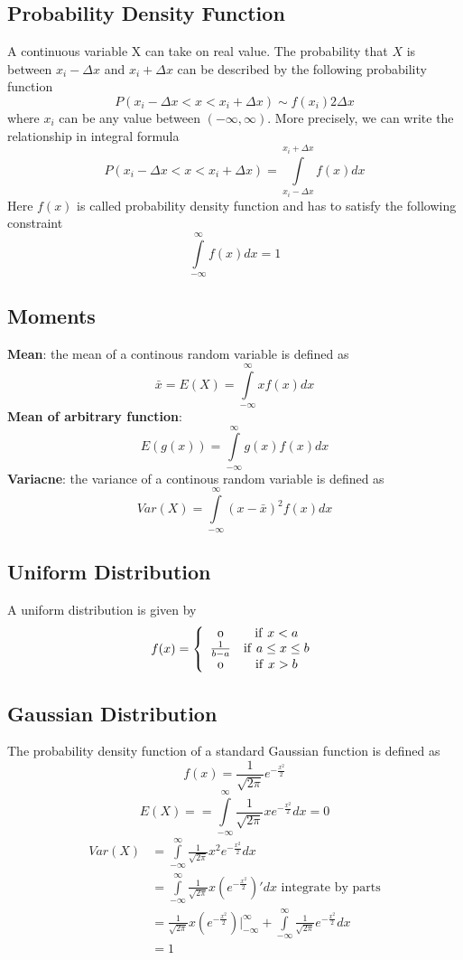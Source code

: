 \documentclass[12pt, oneside]{article}
\begin{document}
\subsection{Probability Density Function}
A continuous variable X can take on real value. The probability that $X$ is between $x_i-\Delta x$ and $x_i+ \Delta x$ can be described by the following probability function
$$P(x_i-\Delta x<x<x_i+\Delta x)\sim f(x_i) 2 \Delta x$$
where $x_i$ can be any value between $(-\infty, \infty)$. More precisely, we can write the relationship in integral formula
$$P(x_i-\Delta x<x<x_i+\Delta x)=\int\limits_{x_i-\Delta x}^{x_i+\Delta x}f(x)dx$$
Here $f(x)$ is called probability density function and has to satisfy the following constraint
$$\int\limits_{-\infty}^{\infty}f(x)dx=1$$
\subsection{Moments}
\textbf{Mean}: the mean of a continous random variable is defined as 
$$\bar{x}=E(X)=\int\limits_{-\infty}^{\infty}xf(x)dx$$
\textbf{Mean of arbitrary function}:
$$E(g(x))=\int\limits_{-\infty}^{\infty}g(x)f(x)dx$$
\textbf{Variacne}: the variance of a continous random variable is defined as 
$$Var(X)=\int\limits_{-\infty}^{\infty}(x-\bar{x})^2f(x)dx$$

\subsection{Uniform Distribution}


A uniform distribution is given by
\begin{align*}
\mathnormal{f(x)} =
    \left\{
        \begin{array}{cc}
              \mathnormal{0} & \mathrm{if\ } \mathnormal{x<a} \\
              \frac{1}{\mathnormal{b-a}}  & \mathnormal{\mathrm{if\ } a\leq x \leq b} \\
              \mathnormal{0} & \mathrm{if\ } \mathnormal{x>b} \\
        \end{array} 
    \right.
\end{align*}


\subsection{Gaussian Distribution}
The probability density function of a standard Gaussian function is defined as 
$$f(x)=\frac{1}{\sqrt{2\pi}}e^{-\frac{x^2}{2}}$$
$$E(X)==\int\limits_{-\infty}^{\infty}\frac{1}{\sqrt{2\pi}}xe^{-\frac{x^2}{2}}dx=0$$
\begin{align*}
Var(X)&=\int\limits_{-\infty}^{\infty}\frac{1}{\sqrt{2\pi}}x^2e^{-\frac{x^2}{2}}dx\\
&=\int\limits_{-\infty}^{\infty}\frac{1}{\sqrt{2\pi}}x(e^{-\frac{x^2}{2}})'dx \text{ integrate by parts}\\
&=\frac{1}{\sqrt{2\pi}}x(e^{-\frac{x^2}{2}})|_{-\infty}^{\infty}+\int\limits_{-\infty}^{\infty}\frac{1}{\sqrt{2\pi}}e^{-\frac{x^2}{2}}dx\\
&=1
\end{align*}
\end{document}
